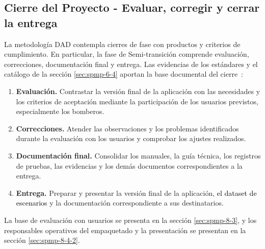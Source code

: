 
\subsection{Cierre del Proyecto - Evaluar, corregir y cerrar la entrega}\label{sec:spmp-10-3}
La metodología DAD contempla cierres de fase con productos y criterios de cumplimiento. En particular, la fase de Semi-transición comprende evaluación, correcciones, documentación final y entrega. Las evidencias de los estándares y el catálogo de la sección \ref{sec:spmp-6-4} aportan la base documental del cierre~\cite{adaptacion2026,vfp2026,std12207,ieee730}:
\begin{enumerate}
\item \textbf{Evaluación.} Contrastar la versión final de la aplicación con las necesidades y los criterios de aceptación mediante la participación de los usuarios previstos, especialmente los bomberos.
\item \textbf{Correcciones.} Atender las observaciones y los problemas identificados durante la evaluación con los usuarios y comprobar los ajustes realizados.
\item \textbf{Documentación final.} Consolidar los manuales, la guía técnica, los registros de pruebas, las evidencias y los demás documentos correspondientes a la entrega.
\item \textbf{Entrega.} Preparar y presentar la versión final de la aplicación, \textcolor{black}{el dataset de escenarios} y la documentación correspondiente a sus destinatarios.
\end{enumerate}
La base de evaluación con usuarios se presenta en la sección \ref{sec:spmp-8-3}, y los responsables operativos del empaquetado y la presentación se presentan en la sección \ref{sec:spmp-8-4-2}.
